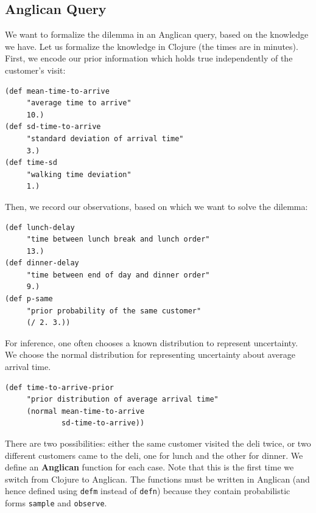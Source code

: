 \documentclass[preprint]{sigplanconf}
\begin{document}
\subsection{Anglican Query}
\label{seq:deli-query}

We want to formalize the dilemma in an Anglican query, based on
the knowledge we have. Let us formalize the knowledge in
Clojure (the times are in minutes). First, we encode our prior
information which holds true independently of the customer's
visit:

\begin{lstlisting}[style=default]
(def mean-time-to-arrive
     "average time to arrive"
     10.)
(def sd-time-to-arrive
     "standard deviation of arrival time"
     3.)
(def time-sd
     "walking time deviation"
     1.)
\end{lstlisting}

Then, we record our observations, based on which we want to
solve the dilemma:

\begin{lstlisting}[style=default]
(def lunch-delay
     "time between lunch break and lunch order"
     13.)
(def dinner-delay
     "time between end of day and dinner order"
     9.)
(def p-same
     "prior probability of the same customer"
     (/ 2. 3.))
\end{lstlisting}


For inference, one often chooses a known distribution to
represent uncertainty. We choose the normal
distribution for representing uncertainty about average arrival
time.

\begin{lstlisting}[style=default]
(def time-to-arrive-prior 
     "prior distribution of average arrival time"
     (normal mean-time-to-arrive
             sd-time-to-arrive))
\end{lstlisting}

There are two possibilities: either the same customer visited
the deli twice, or two different customers came to the deli,
one for lunch and the other for dinner. We define an \textbf{Anglican} function
for each case. Note that this is the first time we switch from
Clojure to Anglican. The functions must be written in Anglican
(and hence defined using \texttt{defm} instead of \texttt{defn})
because they contain probabilistic forms \texttt{sample} and
\texttt{observe}.
\end{document}
